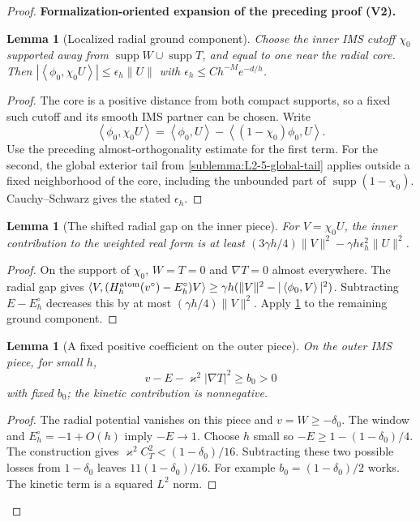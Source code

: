 \documentclass[11pt]{article}
\newtheorem{lemma}[theorem]{Lemma}
\newcommand{\formalisationparentid}{X}
\newenvironment{formalisationaddition}[1]{\par\medskip\begingroup\color{blue}\def\formalisationparentid{#1}\setcounter{formalizationsublemma}{0}\let\lemma\formalizationsublemma\let\endlemma\endformalizationsublemma
  \def\Eo{\mathcal E_h^\circ}\def\EE{\mathcal E_h}\def\phio{\phi_h^\circ}\def\phih{\phi_h}\def\Ho{H_h^{\rm atom}(v^\circ)}\def\Ha{H_h^{\rm atom}}\def\HL{H_h^{L}}\def\Dh{D_h}\def\Log{\operatorname{Log}}\def\ellh{\ell_h}\def\Gp{G_{p,h}}\def\Ast{A_{*,h}}\def\ahat{\widehat{\mathfrak a}_h}\def\ah{\mathfrak a_h}\def\rh{\widehat\rho_h}\def\deltah{\widehat\delta_h}\def\oldref##1{\textup{(##1)}}\def\interface##1{\par\noindent\textit{Analytical interface used here.} ##1\par}\def\finish{\par\noindent\textit{Conclusion of the formalization-oriented expansion.} }\par\noindent\textbf{Formalization-oriented expansion of the preceding proof (V2).}\par\smallskip
}{\par\endgroup\medskip
}
\newcommand{\ip}[2]{\left\langle #1,#2\right\rangle}
\newcommand{\supp}{\operatorname{supp}}
\begin{document}
\begin{proof}
\begin{formalisationaddition}{LA.2}
\begin{lemma}[Localized radial ground component]\label{sublemma:LA-2-inner-overlap}
Choose the inner IMS cutoff $\chi_0$ supported away from
$\supp W\cup\supp T$, and equal to one near the radial core. Then
$|\ip{\phi_0}{\chi_0U}|\le\epsilon_h\|U\|$ with
$\epsilon_h\le Ch^{-M}e^{-d/h}$.
\end{lemma}
\begin{proof}
The core is a positive distance from both compact supports, so a fixed
such cutoff and its smooth IMS partner can be chosen. Write
\[
 \ip{\phi_0}{\chi_0U}
   =\ip{\phi_0}U-\ip{(1-\chi_0)\phi_0}U.
\]
Use the preceding almost-orthogonality estimate for the first term.
For the second, the global exterior tail from
\ref{sublemma:L2-5-global-tail} applies outside a fixed neighborhood of
the core, including the unbounded part of $\supp(1-\chi_0)$.
Cauchy--Schwarz gives the stated $\epsilon_h$.
\end{proof}

\begin{lemma}[The shifted radial gap on the inner piece]\label{sublemma:LA-2-inner-gap}
For $V=\chi_0U$, the inner contribution to the weighted real form is at least
$(3\gamma h/4)\|V\|^2-\gamma h\epsilon_h^2\|U\|^2$.
\end{lemma}
\begin{proof}
On the support of $\chi_0$, $W=T=0$ and $\nabla T=0$ almost everywhere.
The radial gap gives
$\ip V{(\Ho-E_h^\circ)V}\ge
 \gamma h(\|V\|^2-|\ip{\phi_0}V|^2)$.
Subtracting $E-E_h^\circ$ decreases this by at most
$(\gamma h/4)\|V\|^2$. Apply
\ref{sublemma:LA-2-inner-overlap} to the remaining ground component.
\end{proof}

\begin{lemma}[A fixed positive coefficient on the outer piece]\label{sublemma:LA-2-outer-gap}
On the outer IMS piece, for small $h$,
\[
 v-E-\varkappa^2|\nabla T|^2\ge b_0>0
\]
with fixed $b_0$; the kinetic contribution is nonnegative.
\end{lemma}
\begin{proof}
The radial potential vanishes on this piece and $v=W\ge-\delta_0$.
The window and $E_h^\circ=-1+O(h)$ imply $-E\to1$.
Choose $h$ small so $-E\ge1-(1-\delta_0)/4$.
The construction gives $\varkappa^2 C_T^2<(1-\delta_0)/16$.
Subtracting these two possible losses from $1-\delta_0$ leaves
$11(1-\delta_0)/16$. For example $b_0=(1-\delta_0)/2$ works.
The kinetic term is a squared $L^2$ norm.
\end{proof}


\end{formalisationaddition}
\end{proof}
\end{document}
